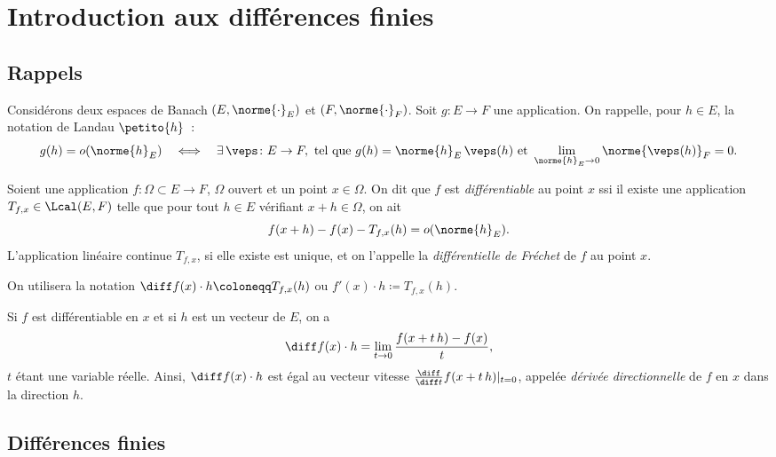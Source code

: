 \section{Introduction aux diff\'erences finies}

\subsection{Rappels}

Consid\'erons deux espaces de Banach $(E,\norme{\cdot}_E)$ et $(F,\norme{\cdot}_F)$.
Soit $g\colon E \to F$ une application. On rappelle, pour $h\in E$, la notation de Landau $\petito{h}$~:
\[
    g(h)=o(\norme{h}_E) \quad  \Longleftrightarrow  \quad \exists\, \veps \colon E \to F, \text{ tel que } g(h) = \norme{h}_E \, \veps(h) \text{ et } 
    \lim_{\norme{h}_E \to 0} \norme{\veps(h)}_F = 0.
\]

\begin{definition}
    Soient une application $f\colon\Omega \subset E \to F$, $\Omega$ ouvert et un point $x\in \Omega$.
    On dit que $f$ est \emph{diff\'erentiable} au point $x$ ssi il existe une application $T_{f,x} \in \Lcal(E,F)$ telle que 
    pour tout $h\in E$ v\'erifiant $x+h\in\Omega$, on ait
    \[
        f(x+h)-f(x) - T_{f,x}(h) = o(\norme{h}_E).
    \]
    L'application lin\'eaire continue $T_{f,x}$, si elle existe est unique, et on l'appelle la \emph{diff\'erentielle de Fr\'echet} de $f$ au point $x$.
\end{definition}

\begin{myremark}
    On utilisera la notation $\diff f(x) \cdot h \coloneqq T_{f,x}(h)$ ou $f'(x) \cdot h \coloneqq T_{f,x}(h)$.
\end{myremark}

Si $f$ est diff\'erentiable en $x$ et si $h$ est un vecteur de $E$, on a
\begin{equation*}
    \diff f(x) \cdot h = \lim_{t\to 0} \frac{f(x+t\,h)-f(x)}{t},
\end{equation*}
$t$ \'etant une variable r\'eelle. Ainsi, $\diff f(x) \cdot h$ est \'egal au vecteur vitesse $\frac{\diff}{\diff t} f(x+t\,h)|_{t=0}$,
appel\'ee \emph{d\'eriv\'ee directionnelle} de $f$ en $x$ dans la direction $h$.

\subsection{Diff\'erences finies}

